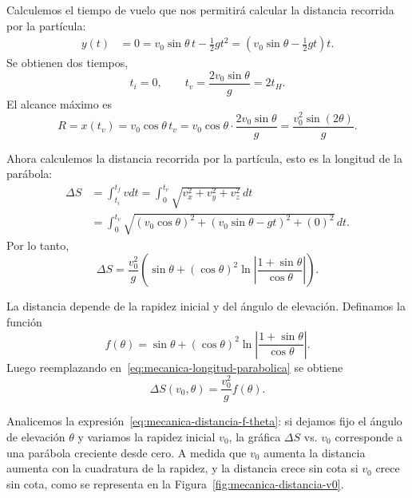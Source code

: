 \documentclass[../apunte_mecanica_clasica.tex]{subfiles}%
\begin{document}
Calculemos el tiempo de vuelo que nos permitirá calcular la distancia recorrida por la partícula:
\begin{align*}
    y(t)&=0=v_0\sin\theta\,t-\frac{1}{2}gt^2
      =\left(v_0\sin\theta-\frac{1}{2}gt\right)t.
\end{align*}
Se obtienen dos tiempos,
\begin{equation}
    t_i=0,
    \qquad
    t_v=\frac{2v_0\sin\theta}{g}=2t_H.
    \label{eq:mecanica-tiempo-vuelo-parabolico}
\end{equation}
El alcance máximo es
\begin{equation}
    R=x(t_v)=v_0\cos\theta\,t_v
      =v_0\cos\theta\cdot\frac{2v_0\sin\theta}{g}
      =\frac{v_0^2\sin(2\theta)}{g}.
    \label{eq:mecanica-alcance-parabolico}
\end{equation}

Ahora calculemos la distancia recorrida por la partícula, esto es la longitud de la parábola:
\begin{align*}
    \Delta S
    &=\int_{t_i}^{t_f}vdt
      =\int_{0}^{t_v}\sqrt{v_x^2+v_y^2+v_z^2}\,dt \\
    &=\int_{0}^{t_v}\sqrt{(v_0\cos\theta)^2+(v_0\sin\theta-gt)^2+(0)^2}\,dt.
\end{align*}
Por lo tanto,
\begin{equation}
    \Delta S=\frac{v_0^2}{g}
    \left(\sin\theta+(\cos\theta)^2\ln\left|\frac{1+\sin\theta}{\cos\theta}\right|\right).
    \label{eq:mecanica-longitud-parabolica}
\end{equation}

La distancia depende de la rapidez inicial y del ángulo de elevación. Definamos la función
\begin{equation}
    f(\theta)=\sin\theta+(\cos\theta)^2\ln\left|\frac{1+\sin\theta}{\cos\theta}\right|.
    \label{eq:mecanica-funcion-f-theta}
\end{equation}
Luego reemplazando en~\eqref{eq:mecanica-longitud-parabolica} se obtiene
\begin{equation}
    \Delta S(v_0,\theta)=\frac{v_0^2}{g}f(\theta).
    \label{eq:mecanica-distancia-f-theta}
\end{equation}

Analicemos la expresión~\eqref{eq:mecanica-distancia-f-theta}: si dejamos fijo el ángulo de elevación $\theta$ y variamos la rapidez inicial $v_0$, la gráfica $\Delta S$ vs. $v_0$ corresponde a una parábola creciente desde cero. A medida que $v_0$ aumenta la distancia aumenta con la cuadratura de la rapidez, y la distancia crece sin cota si $v_0$ crece sin cota, como se representa en la Figura~\ref{fig:mecanica-distancia-v0}.
\end{document}
